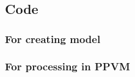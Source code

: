 \chapter{}\label{ap1}
\thispagestyle{empty}
\section{Code}\label{code}

\subsection{For creating model}
\lstset{style=mystyle}


\subsection{For processing in PPVM}
\lstset{style=mystyle}





\newpage
\chapter{}\label{ap2}
